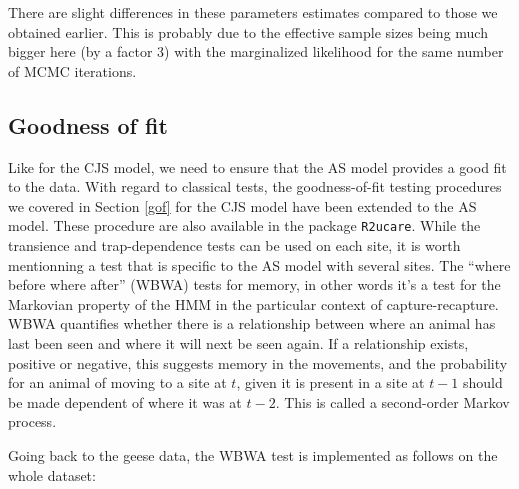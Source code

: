 \documentclass[
  12pt,
]{krantz}
\newenvironment{Shaded}{\begin{snugshade}}{\end{snugshade}}
\newcommand{\DecValTok}[1]{\textcolor[rgb]{0.00,0.00,0.81}{#1}}
\newcommand{\DocumentationTok}[1]{\textcolor[rgb]{0.56,0.35,0.01}{\textbf{\textit{#1}}}}
\newcommand{\FunctionTok}[1]{\textcolor[rgb]{0.13,0.29,0.53}{\textbf{#1}}}
\newcommand{\NormalTok}[1]{#1}
\newcommand{\OtherTok}[1]{\textcolor[rgb]{0.56,0.35,0.01}{#1}}
\newcommand{\SpecialCharTok}[1]{\textcolor[rgb]{0.81,0.36,0.00}{\textbf{#1}}}
\newcommand{\StringTok}[1]{\textcolor[rgb]{0.31,0.60,0.02}{#1}}
\begin{document}
There are slight differences in these parameters estimates compared to those we obtained earlier. This is probably due to the effective sample sizes being much bigger here (by a factor 3) with the marginalized likelihood for the same number of MCMC iterations.

\subsection{Goodness of fit}\label{gofas}

Like for the CJS model, we need to ensure that the AS model provides a good fit to the data. With regard to classical tests, the goodness-of-fit testing procedures we covered in Section \ref{gof} for the CJS model have been extended to the AS model. These procedure are also available in the package \texttt{R2ucare}. While the transience and trap-dependence tests can be used on each site, it is worth mentionning a test that is specific to the AS model with several sites. The ``where before where after'' (WBWA) tests for memory, in other words it's a test for the Markovian property of the HMM in the particular context of capture-recapture. WBWA quantifies whether there is a relationship between where an animal has last been seen and where it will next be seen again. If a relationship exists, positive or negative, this suggests memory in the movements, and the probability for an animal of moving to a site at \(t\), given it is present in a site at \(t-1\) should be made dependent of where it was at \(t-2\). This is called a second-order Markov process.

Going back to the geese data, the WBWA test is implemented as follows on the whole dataset:

\begin{Shaded}
\end{Shaded}
\end{document}
